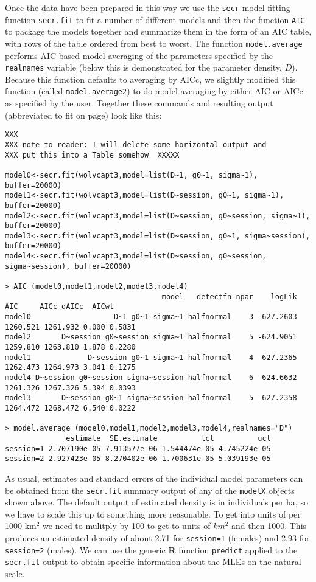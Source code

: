 Once the data have been prepared in this way we use the
\mbox{\tt secr} model fitting function \mbox{\tt secr.fit} to fit a
number of different models and then the function \mbox{\tt AIC} to
package the models together and summarize them in the form of an AIC
table, with rows of the table ordered from best to worst. The function
\mbox{\tt model.average} performs AIC-based model-averaging of the
parameters specified by the \mbox{\tt realnames} variable (below this
is demonstrated for the parameter density, $D$).  Because this
function defaults to averaging by AICc, we slightly modified
this function (called \mbox{\tt model.average2}) to do model averaging
by either  AIC or AICc as specified by the user. Together
these commands and resulting output (abbreviated to fit on page) look like this:
{\small
\begin{verbatim}
XXX
XXX note to reader: I will delete some horizontal output and
XXX put this into a Table somehow  XXXXX

model0<-secr.fit(wolvcapt3,model=list(D~1, g0~1, sigma~1), buffer=20000)
model1<-secr.fit(wolvcapt3,model=list(D~session, g0~1, sigma~1), buffer=20000)
model2<-secr.fit(wolvcapt3,model=list(D~session, g0~session, sigma~1), buffer=20000)
model3<-secr.fit(wolvcapt3,model=list(D~session, g0~1, sigma~session), buffer=20000)
model4<-secr.fit(wolvcapt3,model=list(D~session, g0~session, sigma~session), buffer=20000)

> AIC (model0,model1,model2,model3,model4)
                                    model   detectfn npar    logLik      AIC     AICc dAICc  AICwt
model0                   D~1 g0~1 sigma~1 halfnormal    3 -627.2603 1260.521 1261.932 0.000 0.5831
model2       D~session g0~session sigma~1 halfnormal    5 -624.9051 1259.810 1263.810 1.878 0.2280
model1             D~session g0~1 sigma~1 halfnormal    4 -627.2365 1262.473 1264.973 3.041 0.1275
model4 D~session g0~session sigma~session halfnormal    6 -624.6632 1261.326 1267.326 5.394 0.0393
model3       D~session g0~1 sigma~session halfnormal    5 -627.2358 1264.472 1268.472 6.540 0.0222

> model.average (model0,model1,model2,model3,model4,realnames="D")
              estimate  SE.estimate          lcl          ucl
session=1 2.707190e-05 7.913577e-06 1.544474e-05 4.745224e-05
session=2 2.927423e-05 8.270402e-06 1.700631e-05 5.039193e-05
\end{verbatim}
}
As usual, estimates and standard errors of the individual model
parameters can be obtained from the \mbox{\tt secr.fit} summary output
of any of the \mbox{\tt modelX} objects shown above.
The default output of estimated density is in individuals per ha, so
we have to scale this up to something more reasonable. To get into
units of per 1000 km$^2$ we need to mulitply by 100 to get to units of
$km^2$ and then 1000. This produces an estimated density of
about 2.71 for \mbox{\tt session=1} (females) and 2.93 for
\mbox{\tt session=2} (males).  We can use the generic {\bf R} function
\mbox{\tt predict} applied to the \mbox{\tt secr.fit} output to obtain
 specific information about the MLEs on the natural scale.

